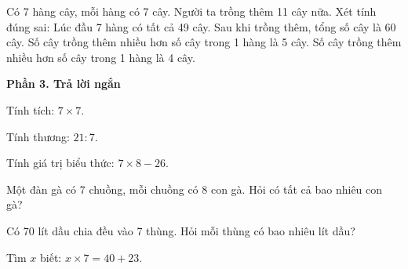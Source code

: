\begin{ex} %
Có 7 hàng cây, mỗi hàng có 7 cây. Người ta trồng thêm 11 cây nữa. Xét tính đúng sai:
\choiceTF
{\True Lúc đầu 7 hàng có tất cả 49 cây.}
{\True Sau khi trồng thêm, tổng số cây là 60 cây.}
{Số cây trồng thêm nhiều hơn số cây trong 1 hàng là 5 cây.}
{\True Số cây trồng thêm nhiều hơn số cây trong 1 hàng là 4 cây.}
\end{ex}

\textbf{Phần 3. Trả lời ngắn}

\begin{ex} %
Tính tích: $7 \times 7$.
\end{ex}

\begin{ex} %
Tính thương: $21 : 7$.
\end{ex}

\begin{ex} %
Tính giá trị biểu thức: $7 \times 8 - 26$.
\end{ex}

\begin{ex} %
Một đàn gà có 7 chuồng, mỗi chuồng có 8 con gà. Hỏi có tất cả bao nhiêu con gà?
\end{ex}

\begin{ex} %
Có 70 lít dầu chia đều vào 7 thùng. Hỏi mỗi thùng có bao nhiêu lít dầu?
\end{ex}

\begin{ex} %
Tìm $x$ biết: $x \times 7 = 40 + 23$.
\end{ex}
